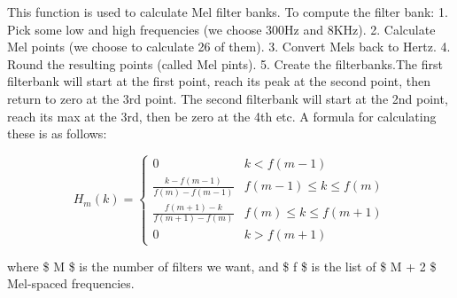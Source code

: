 \documentclass[11pt]{article}
\begin{document}
    This function is used to calculate Mel filter banks. To compute the
filter bank: 1. Pick some low and high frequencies (we choose 300Hz and
8KHz). 2. Calculate Mel points (we choose to calculate 26 of them). 3.
Convert Mels back to Hertz. 4. Round the resulting points (called Mel
pints). 5. Create the filterbanks.The first filterbank will start at the
first point, reach its peak at the second point, then return to zero at
the 3rd point. The second filterbank will start at the 2nd point, reach
its max at the 3rd, then be zero at the 4th etc. A formula for
calculating these is as follows:

\[
     H_m(k) = 
    \begin{cases} 
        0                                & k < f(m-1) \\
        \frac{k - f(m-1)}{f(m) - f(m-1)} & f(m-1) \leq k \leq f(m) \\
        \frac{f(m+1) - k}{f(m+1) - f(m)} & f(m) \leq k \leq f(m+1) \\
        0                                & k > f(m+1)
    \end{cases}
 \]

where \$ M \$ is the number of filters we want, and \$ f \$ is the list
of \$ M + 2 \$ Mel-spaced frequencies.
\end{document}
